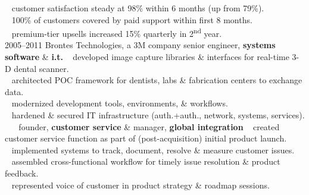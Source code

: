 \documentclass[]{friggeri-cv} %
\begin{document}
\begin{entrylist}
{{\tiny {}} ~ customer satisfaction steady at 98\% within 6 months (up from 79\%).\\
{\tiny {}} ~ 100\% of customers covered by paid support within first 8 months.\\
{\tiny {}} ~ premium-tier upsells increased 15\% quarterly in 2\textsuperscript{nd} year.\\}
\entry
{2005--2011}
{Brontes Technologies, a 3M company}
{senior engineer, {\textbf{\color{DarkGray}systems software} \& {\textbf{\color{DarkGray}i.t.}}}}
{{\tiny {}} ~ developed image capture libraries \& interfaces for real-time 3-D dental scanner.\\
{\tiny {}} ~ architected POC framework for dentists, labs \& fabrication centers to exchange data.\\
{\tiny {}} ~ modernized development tools, environments, \& workflows.\\
{\tiny {}} ~ hardened \& secured IT infrastructure (auth.+auth., network, systems, services).}
\entry
{~}
{~}
{founder, \textbf{\color{DarkGray}customer service} \& manager, \textbf{\color{DarkGray}global integration}}
{{\tiny {}} ~ created customer service function as part of (post-acquisition) initial product launch.\\
{\tiny {}} ~ implemented  systems to track, document, resolve \& measure customer issues.\\
{\tiny {}} ~ assembled cross-functional workflow for timely issue resolution \& product feedback.\\
{\tiny {}} ~ represented voice of customer in product strategy \& roadmap sessions.\\

}
\end{entrylist}
\end{document}
